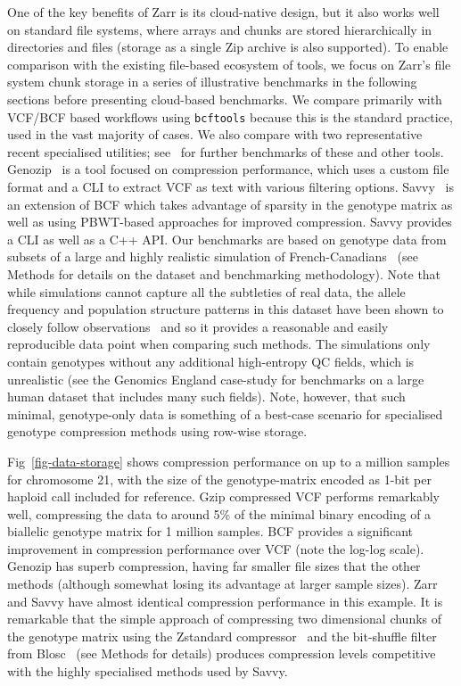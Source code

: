 \documentclass[a4paper,num-refs]{oup-contemporary}
\begin{document}
One of the key benefits of Zarr is its cloud-native design, 
but it also works well on standard file systems, where 
arrays and chunks are stored hierarchically in directories
and files (storage as a single Zip archive is also supported).
To enable comparison with the existing file-based ecosystem
of tools, we focus on Zarr's file system chunk storage in a series of illustrative 
benchmarks in the following sections before presenting cloud-based benchmarks. 
We compare primarily with
VCF/BCF based workflows using \texttt{bcftools} because this
is the standard practice, used in the vast majority of cases.
We also compare with two representative recent specialised utilities;
see~\cite{danek2018gtc,zhang2023gbc} for further benchmarks of 
these and other tools.
Genozip~\cite{lan2020genozip,lan2021genozip} is a tool focused 
on compression performance, which uses a custom file format 
and a CLI to extract VCF as text with various filtering options.
Savvy~\cite{lefaive2021sparse} is an extension of BCF which 
takes advantage of sparsity in the genotype matrix as well
as using PBWT-based approaches for improved compression.
Savvy provides a CLI as well as a C++ API.
Our benchmarks are based on genotype data 
from subsets of a large and highly realistic 
simulation of French-Canadians~\cite{anderson2023on}
(see Methods for details on the dataset and benchmarking methodology).
Note that while simulations cannot capture 
all the subtleties of real data, the allele frequency
and population structure patterns in this dataset 
have been shown to closely follow 
observations~\cite{anderson2023on} and so it provides 
a reasonable and easily reproducible data point 
when comparing such methods.
The simulations only contain genotypes without any additional
high-entropy QC fields, which is unrealistic 
(see the Genomics England case-study
for benchmarks on a large human dataset that includes 
many such fields). 
Note, however, that such minimal, genotype-only data 
is something of a best-case scenario for specialised genotype
compression methods using row-wise storage.

Fig~\ref{fig-data-storage} shows compression performance 
on up to a million samples for chromosome 21, with 
the size of the genotype-matrix encoded as 1-bit per haploid
call included for reference.
Gzip compressed VCF performs remarkably well, compressing 
the data to around 5\% of the 
minimal binary encoding of a biallelic genotype matrix
for 1 million samples. 
BCF provides a significant improvement in compression
performance over VCF (note the log-log scale). Genozip has 
superb compression, having far smaller file sizes that the 
other methods (although somewhat losing its advantage at 
larger sample sizes). Zarr and Savvy have 
almost identical compression performance in this example.
It is remarkable that the simple approach of compressing
two dimensional chunks of the genotype matrix 
using the Zstandard compressor~\citep{collet2021rfc} and the 
bit-shuffle filter from Blosc~\cite{alted2010modern} 
(see Methods for details) produces 
compression levels competitive with the highly specialised methods
used by Savvy.
\end{document}
